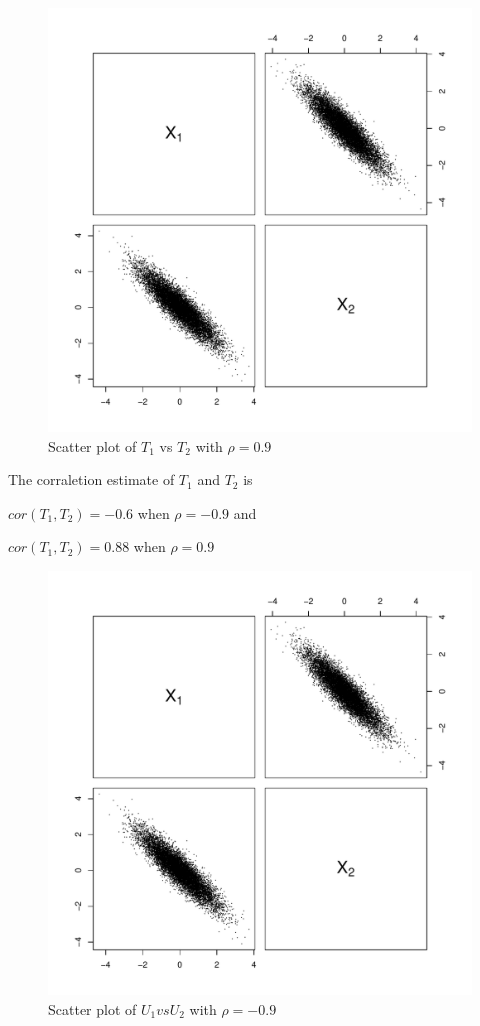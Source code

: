 \documentclass[a4paper, 11pt]{article}
\begin{document}
\begin{figure}[H]
  \centering
  \includegraphics[scale=0.5,page=5]{Rplots4.pdf}
  \caption{Scatter plot of $T_1$ vs $T_2$ with $\rho = 0.9$}
  \label{t1t2pos}
\end{figure}

The corraletion estimate of $T_1$ and $T_2$ is

$cor(T_1,T_2) = -0.6$
when $\rho = -0.9$ and

$cor(T_1,T_2) = 0.88$
when $\rho = 0.9$

\begin{figure}[H]
  \centering
  \includegraphics[scale=0.5,page=3]{Rplots4.pdf}
  \caption{Scatter plot of $U_1 vs U_2$ with $\rho = -0.9$}
  \label{u1u2neg}
\end{figure}
\end{document}
